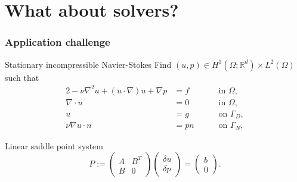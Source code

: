 \documentclass[presentation]{beamer}
\newcommand{\honev}{\ensuremath{{H}^1(\Omega; \mathbb{R}^d)}\xspace}
\newcommand{\ltwo}{\ensuremath{{L}^2(\Omega)}\xspace}
\newcommand{\advect}[2]{\ensuremath{(#2 \cdot \nabla) #1}}
\begin{document}
\section{What about solvers?}

\begin{frame}
  \frametitle{Application challenge}
  \begin{block}{Stationary incompressible Navier-Stokes}
    Find $(u, p) \in \honev \times \ltwo$ such that
    \begin{alignat*}{2}
      -  \nu \nabla^2 u + \advect{u}{u} + \nabla p &= f \quad && \text{ in } \Omega, \label{eqn:momentum} \\
      \nabla \cdot u &= 0 \quad && \text{ in } \Omega, \\
      u &= g \quad && \text{ on } \Gamma_D, \\
      \nu \nabla u \cdot n &= pn \quad && \text{ on } \Gamma_N,
    \end{alignat*}
  \end{block}
  \begin{block}{Linear saddle point system}
    \begin{equation*}
      P := \begin{pmatrix}
        A & B^T \\
        B & 0
      \end{pmatrix}
      \begin{pmatrix}
        \delta u \\ \delta p
      \end{pmatrix}
      =
      \begin{pmatrix}
        b \\ 0
      \end{pmatrix}.
    \end{equation*}
  \end{block}
\end{frame}
\end{document}
